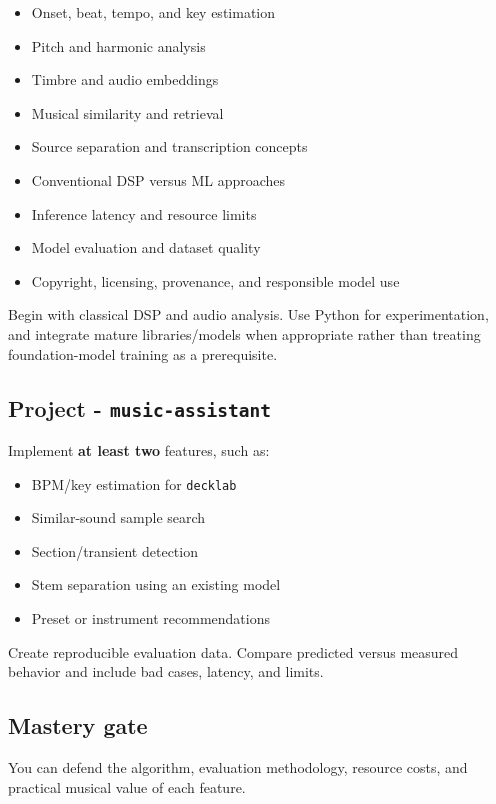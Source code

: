\documentclass[11pt,letterpaper]{article}
\begin{document}
\begin{itemize}
\item Onset, beat, tempo, and key estimation
\item Pitch and harmonic analysis
\item Timbre and audio embeddings
\item Musical similarity and retrieval
\item Source separation and transcription concepts
\item Conventional DSP versus ML approaches
\item Inference latency and resource limits
\item Model evaluation and dataset quality
\item Copyright, licensing, provenance, and responsible model use
\end{itemize}

Begin with classical DSP and audio analysis. Use Python for experimentation, and integrate mature libraries/models when appropriate rather than treating foundation-model training as a prerequisite.

\subsection*{Project - \texttt{music-assistant}}\label{project-music-assistant}

Implement \textbf{at least two} features, such as:

\begin{itemize}
\item BPM/key estimation for \texttt{decklab}
\item Similar-sound sample search
\item Section/transient detection
\item Stem separation using an existing model
\item Preset or instrument recommendations
\end{itemize}

Create reproducible evaluation data. Compare predicted versus measured behavior and include bad cases, latency, and limits.

\subsection*{Mastery gate}\label{mastery-gate-11}

You can defend the algorithm, evaluation methodology, resource costs, and practical musical value of each feature.
\end{document}
